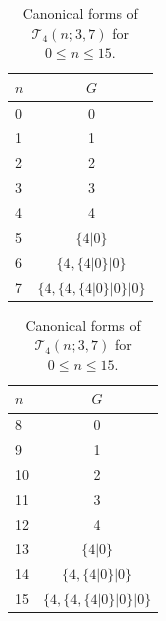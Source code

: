 \documentclass[oneside,reqno]{amsart}
\newcommand{\ts}{\mathcal{T}}
\begin{document}
\begin{table}[h!]
    \centering
    \caption{Canonical forms of $\ts_{4}(n;3,7)$ for $0 \le n \le 15$.}
    \label{tab:CF of ts_4(n,3,7)}
    
    \setlength{\tabcolsep}{4pt}
    \renewcommand{\arraystretch}{1.2}
    
    \begin{minipage}{0.48\textwidth}
    \centering
    \small
    \begin{tabular}{|l|c|}
    \hline
    $n$ & $G$ \\ \hline
    0  & 0 \\ \hline
    1  & 1 \\ \hline
    2  & 2 \\ \hline
    3  & 3 \\ \hline
    4  & 4 \\ \hline
    5  & $\{4|0\}$ \\ \hline
    6  & $\{4, \{4|0\} | 0\}$ \\ \hline
    7  & $\{4, \{4, \{4|0\} | 0\} | 0\}$ \\ \hline
    
    \end{tabular}
    \end{minipage}
    \hfill
    \begin{minipage}{0.48\textwidth}
    \centering
    \small
    \begin{tabular}{|l|c|}
    \hline
    $n$ & $G$ \\ \hline
    8  & 0 \\ \hline
    9  & 1 \\ \hline
    10 & 2 \\ \hline
    11 & 3 \\ \hline
    12 & 4 \\ \hline
    13 & $\{4|0\}$ \\ \hline
    14 & $\{4, \{4|0\} | 0\}$ \\ \hline
    15 & $\{4, \{4, \{4|0\} | 0\} | 0\}$ \\ \hline
    \end{tabular}
    \end{minipage}
\end{table}
\end{document}
